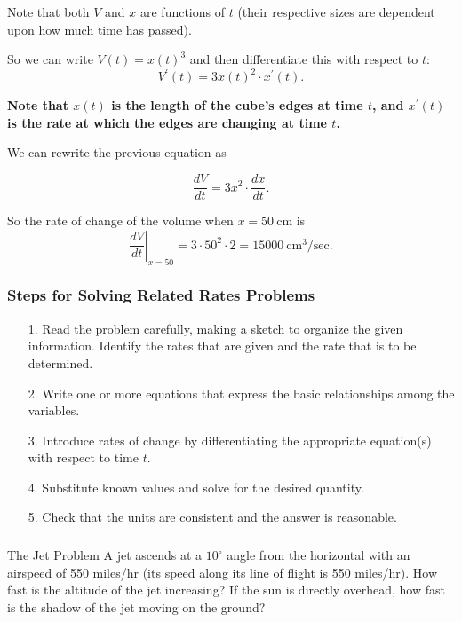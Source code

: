 \documentclass[14pt]{beamer}
\begin{document}
\begin{frame}
\small
Note that both $V$ and $x$ are functions of $t$ (their respective sizes are dependent upon how much time has passed).

\vspace{1pc}
So we can write $V(t)=x(t)^3$ and then differentiate this with respect to $t$:
$$V^{\prime}(t) = 3 x(t)^2 \cdot x^{\prime}(t).$$

\vspace{1pc}
{\bf Note that $x(t)$ is the length of the cube's edges at time $t$, and $x^{\prime}(t)$ is the rate at which the edges are changing at time $t$.}
\end{frame}

\begin{frame}

We can rewrite the previous equation as

\[\frac{dV}{dt}=3x^2 \cdot \frac{dx}{dt}.\]

\vspace{1pc}
So the rate of change of the volume when $x=50\ \text{cm}$ is 
\[\left.\frac{dV}{dt}\right|_{x=50}=3\cdot 50^2 \cdot 2 = 15000\ \text{cm}^3/\text{sec}.\]
\end{frame}

\begin{frame}
\frametitle{\small Steps for Solving Related Rates Problems}
\small
\begin{itemize}
\item[1.] Read the problem carefully, making a sketch to organize the given information.  Identify the rates that are given and the rate that is to be determined.
\item[2.] Write one or more equations that express the basic relationships among the variables.
\item[3.] Introduce rates of change by differentiating the appropriate equation(s) with respect to time $t$.
\item[4.] Substitute known values and solve for the desired quantity.
\item[5.] Check that the units are consistent and the answer is reasonable.
\end{itemize}
\end{frame}

\begin{frame}
\frametitle{}
\begin{block}{The Jet Problem}
A jet ascends at a $10^{\circ}$ angle from the horizontal with an airspeed of 550 miles/hr (its speed along its line of flight is 550 miles/hr).  How fast is the altitude of the jet increasing?  If the sun is directly overhead, how fast is the shadow of the jet moving on the ground?
\end{block}
\end{frame}
\end{document}
